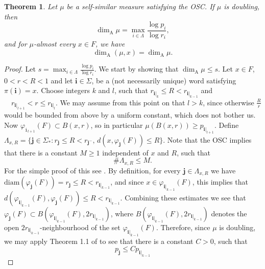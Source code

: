 \documentclass{PRM}
\newcommand{\diam}{\mathrm{diam}}
\newcommand{\adim}{\dim_{\mathrm{A}}}
\newcommand{\iii}{\mathbf{i}}
\theoremstyle{plain}
\newtheorem{thm}{Theorem}[section]
\theoremstyle{definition}
\theoremstyle{remark}
\begin{document}
\begin{thm}\label{thm:osc_formula}
Let $\mu$ be a self-similar measure satisfying the OSC. If $\mu$ is doubling, then
\begin{equation*}
    \dim_{\mathrm{A}}\mu=\max_{i\in\Lambda}\frac{\log p_i}{\log r_i},
\end{equation*}
and for $\mu$-almost every $x\in F$, we have
\begin{equation*}
    \dim_{\mathrm{A}}(\mu,x)=\adim\mu.
\end{equation*}

\end{thm}
\begin{proof}
Let $s=\max_{i\in\Lambda}\frac{\log p_i}{\log r_i}$. We start by showing that $\adim\mu\leq s$. Let $x\in F$, $0<r<R<1$ and let $\iii\in\Sigma$, be a (not necessarily unique) word satisfying $\pi(\iii)=x$. Choose integers $k$ and $l$, such that $r_{\mathbf{i}|_k}\leq R < r_{\mathbf{i}|_{k-1}}$ and $\quad r_{\mathbf{i}|_{l+1}}< r \leq r_{\mathbf{i}|_{l}}$.
We may assume from this point on that $l>k$, since otherwise $\frac{R}{r}$ would be bounded from above by a uniform constant, which does not bother us. Now $\varphi_{\mathtt{i}_{l+1}}(F)\subset B(x,r)$, so in particular $\mu(B(x,r))\geq p_{\mathbf{i}|_{l+1}}$. Define $\Lambda_{x,R}=\{\mathbf{j}\in\Sigma_*\colon r_{\mathbf{j}}\leq R < r_{\mathbf{j}^{-}}, \,d(x,\varphi_{\mathbf{j}}(F))\leq R\}$. Note that the OSC implies that there is a constant $M\geq 1$ independent of $x$ and $R$, such that
\begin{equation*}
    \#\Lambda_{x,R}\leq M.
\end{equation*}
For the simple proof of this see \cite[Proposition 1.5.8]{Kig}. By definition, for every $\mathbf{j}\in\Lambda_{x,R}$ we have $\diam(\varphi_{\mathbf{j}}(F))=r_{\mathbf{j}}\leq R < r_{\mathbf{i}|_{k-1}}$,
and since $x\in \varphi_{\mathbf{i}|_{k-1}}(F)$, this implies that $d(\varphi_{\mathbf{i}|_{k-1}}(F),\varphi_{\mathbf{j}}(F))\leq R < r_{\mathbf{i}|_{k-1}}$.
Combining these estimates we see that $\varphi_{\mathbf{j}}(F)\subset B(\varphi_{\mathbf{i}|_{k-1}}(F),2r_{\mathbf{i}|_{k-1}})$, where $B(\varphi_{\mathbf{i}|_{k-1}}(F),2r_{\mathbf{i}|_{k-1}})$ denotes the open $2r_{\mathbf{i}|_{k-1}}$-neighbourhood of the set $\varphi_{\mathbf{i}|_{k-1}}(F)$. Therefore, since $\mu$ is doubling, we may apply Theorem 1.1 of \cite{Yung} to see that there is a constant $C>0$, such that
\begin{equation*}
    p_{\mathbf{j}}\leq Cp_{\mathbf{i}|_{k-1}}
\end{equation*}

\end{proof}
\end{document}
